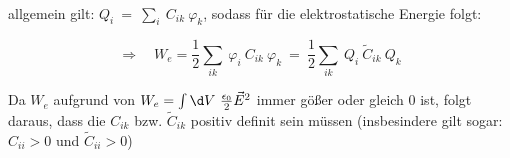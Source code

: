 \ \\
allgemein gilt: $Q_i \ = \ \sum_i \ C_{ik} \ \varphi_k$, sodass für die elektrostatische Energie folgt:


\begin{equation*}
\Rightarrow \quad W_e = \frac{1}{2} \sum_{ik} \ \varphi_i \ C_{ik} \ \varphi_k \ = 
\ \frac{1}{2} \sum_{ik} \ Q_i \ \tilde{C}_{ik} \ Q_k
\end{equation*}

Da $W_e$ aufgrund von $W_e = \int\d V \ \frac{\epsilon_0}{2} \vec{E}^2$ immer gößer oder gleich 0 ist, folgt daraus, dass die $C_{ik}$ bzw. $\tilde{C}_{ik}$ positiv definit sein müssen (insbesindere gilt sogar: $C_{ii} > 0$ und $\tilde{C}_{ii} > 0$)